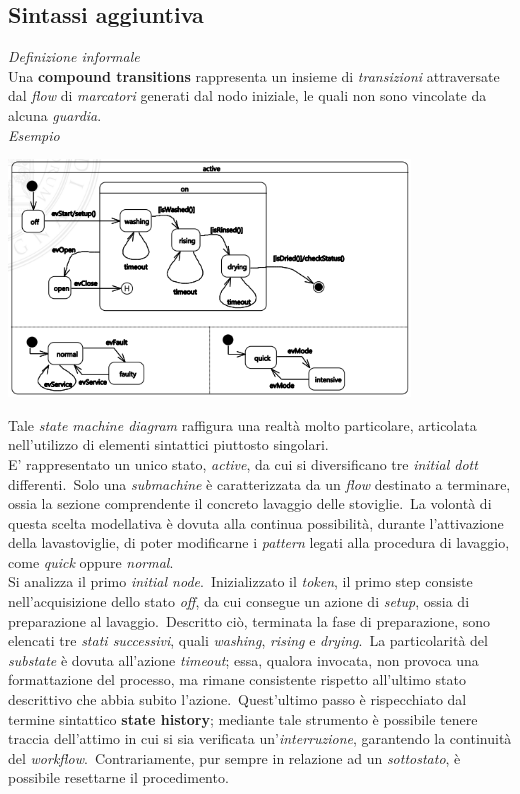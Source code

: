 \documentclass{article}
\begin{document}
\subsection*{Sintassi aggiuntiva}
\large
\textit{Definizione informale}\\Una \textbf{compound transitions} rappresenta un insieme di \textit{transizioni} attraversate dal \textit{flow} di \textit{marcatori} generati dal nodo iniziale, le quali non sono vincolate da alcuna \textit{guardia}.\vspace*{14pt}\\
\textit{Esempio}\vspace*{7pt}
\begin{center}
    \includegraphics*[width=0.8\textwidth]{foto 10.png}
\end{center}
Tale \textit{state machine diagram} raffigura una realtà molto particolare, articolata nell'utilizzo di elementi sintattici piuttosto singolari.\vspace*{14pt}\\
E' rappresentato un unico stato, \textit{active}, da cui si diversificano tre \textit{initial dott} differenti.\ Solo una \textit{submachine} è caratterizzata da un \textit{flow} destinato a terminare, ossia la sezione comprendente il concreto lavaggio delle stoviglie.\ La volontà di questa scelta modellativa è dovuta alla continua possibilità, durante l'attivazione della lavastoviglie, di poter modificarne i \textit{pattern} legati alla procedura di lavaggio, come \textit{quick} oppure \textit{normal}.\vspace*{14pt}\\
Si analizza il primo \textit{initial node}.\ Inizializzato il \textit{token}, il primo step consiste nell'acquisizione dello stato \textit{off}, da cui consegue un azione di \textit{setup}, ossia di preparazione al lavaggio.\ Descritto ciò, terminata la fase di preparazione, sono elencati tre \textit{stati successivi}, quali \textit{washing}, \textit{rising} e \textit{drying}.\ La particolarità del \textit{substate} è dovuta all'azione \textit{timeout}; essa, qualora invocata, non provoca una formattazione del processo, ma rimane consistente rispetto all'ultimo stato descrittivo che abbia subito l'azione.\ Quest'ultimo passo è rispecchiato dal termine sintattico \textbf{state history}; mediante tale strumento è possibile tenere traccia dell'attimo in cui si sia verificata un'\textit{interruzione}, garantendo la continuità del \textit{workflow}.\ Contrariamente, pur sempre in relazione ad un \textit{sottostato}, è possibile resettarne il procedimento.\vspace*{14pt}\\
\end{document}
